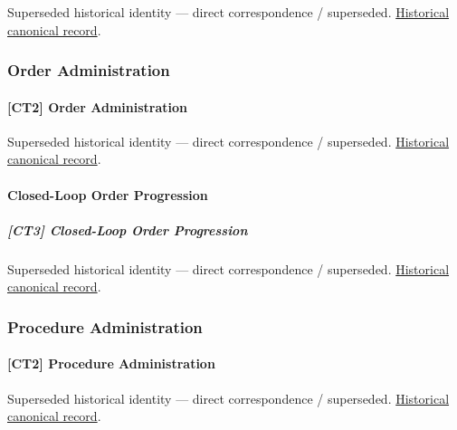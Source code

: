 \par\label{element:5a38bf2527a8404bac714121f2dc76a9}
Superseded historical identity — direct correspondence / superseded. \href{../../../../continuum/strategy/capability/5a38bf2527a8404bac714121f2dc76a9.md}{Historical canonical record}.\par

\subsubsection{Order Administration}

\paragraph{[CT2] Order Administration}

\par\label{element:ebb735a2915744819d4001d9b8425cc6}
Superseded historical identity — direct correspondence / superseded. \href{../../../../continuum/strategy/capability/ebb735a2915744819d4001d9b8425cc6.md}{Historical canonical record}.\par

\paragraph{Closed-Loop Order Progression}

\subparagraph{[CT3] Closed-Loop Order Progression}

\par\label{element:2ad29cebc1e94053a300d869e7797232}
Superseded historical identity — direct correspondence / superseded. \href{../../../../continuum/strategy/capability/2ad29cebc1e94053a300d869e7797232.md}{Historical canonical record}.\par

\subsubsection{Procedure Administration}

\paragraph{[CT2] Procedure Administration}

\par\label{element:466a4057001846bb8ae0481453d3e410}
Superseded historical identity — direct correspondence / superseded. \href{../../../../continuum/strategy/capability/466a4057001846bb8ae0481453d3e410.md}{Historical canonical record}.\par

